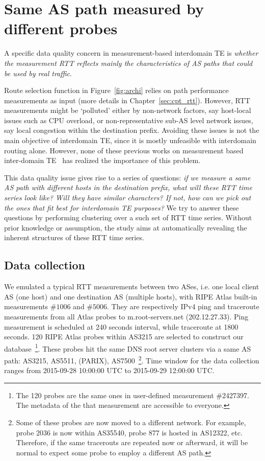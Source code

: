 \section{Same AS path measured by different probes}
A specific data quality concern in measurement-based interdomain TE is \textit{whether the measurement RTT reflects mainly the characteristics of AS paths that could be used by real traffic}.

Route selection function in Figure~\ref{fig:archi} relies on path performance measurements as input (more details in Chapter~\ref{sec:cpt_rtt}).
However, RTT measurements might be `polluted' either by non-network factors, say host-local issues such as CPU overload, or non-representative sub-AS level network issues, say local congestion within the destination prefix.
Avoiding these issues is not the main objective of interdomain TE, since it is mostly unfeasible with interdomain routing alone.
However, none of these previous works on measurement based inter-domain TE~\cite{Goldenberg2004, Akella2008} has realized the importance of this problem.

This data quality issue gives rise to a series of questions: \textit{if we measure a same AS path with different hosts in the destination prefix, what will these RTT time series look like? Will they have similar characters? If not, how can we pick out the ones that fit best for interdomain TE purposes?}
We try to answer these questions by performing clustering over a such set of RTT time series.
Without prior knowledge or assumption, the study aims at automatically revealing the inherent structures of these RTT time series.

\subsection{Data collection}
We emulated a typical RTT measurements between two ASes, i.e. one local client AS (one host) and one destination AS (multiple hosts), with RIPE Atlas built-in measurements $\#1006$ and $\#5006$.
They are respectively IPv4 ping and traceroute measurements from all Atlas probes to m.root-servers.net (202.12.27.33). 
Ping measurement is scheduled at 240 seconds interval, while traceroute at 1800 seconds.
120 RIPE Atlas probes within AS3215 are selected to construct our database~\footnote{The 120 probes are the same ones in user-defined measurement \#2427397. The metadata of the that measurement are accessible to everyone.}.
These probes hit the same DNS root server clusters via a same AS path: AS3215, AS5511, (PARIX), AS7500~\footnote{Some of these probes are now moved to a different network. For example, probe 2036 is now within AS35540, probe 877 is hosted in AS12322, etc. Therefore, if the same tracerouts are repeated now or afterward, it will be normal to expect some probe to employ a different AS path.}. 
Time window for the data collection ranges from 2015-09-28 10:00:00 UTC to 2015-09-29 12:00:00 UTC.

